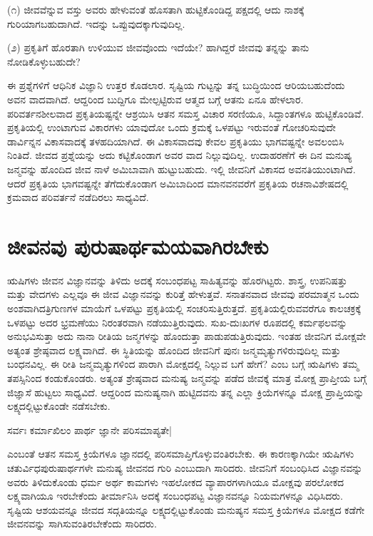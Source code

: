 (೧) ಜೀವವೆನ್ನುವ ವಸ್ತು ಅವರು ಹೇಳುವಂತೆ ಹೊಸತಾಗಿ ಹುಟ್ಟಿಕೊಂಡಿದ್ದ ಪಕ್ಷದಲ್ಲಿ ಆದು ನಾಶಕ್ಕೆ ಗುರಿಯಾಗಬಹುದಾಗಿದೆ. ಇದನ್ನು ಒಪ್ಪುವುದಕ್ಕಾಗುವುದಿಲ್ಲ. 

(೨) ಪ್ರಕೃತಿಗೆ ಹೊರತಾಗಿ ಉಳಿಯುವ ಜೀವವೊಂದು ಇದೆಯೇ? ಹಾಗಿದ್ದರೆ ಜೀವವು ತನ್ನನ್ನು ತಾನು ನೋಡಿಕೊಳ್ಳುಬಹುದೇ? 

ಈ ಪ್ರಶ್ನೆಗಳಿಗೆ ಆಧಿನಿಕ ವಿಜ್ಞಾನಿ ಉತ್ತರ ಕೊಡಲಾರ. ಸೃಷ್ಟಿಯ ಗುಟ್ಟನ್ನು ತನ್ನ ಬುದ್ಧಿಯಿಂದ ಆರಿಯಬಹುದೆಂದು ಅವನ ವಾದವಾಗಿದೆ. ಆದ್ದರಿಂದ ಬುದ್ದಿಗೂ ಮೇಲ್ಪಟ್ಟಿರುವ ಆತ್ಮದ ಬಗ್ಗೆ ಆತನು ಏನೂ ಹೇಳಲಾರ. ಪರಿವರ್ತನಶೀಲವಾದ ಪ್ರಕೃತಿಯಷ್ಟನ್ನೇ ಆಶ್ರಯಿಸಿ ಆತನ ಸಮಸ್ತ ವಿಚಾರ ಸರಣಿಯೂ, ಸಿದ್ದಾಂತಗಳೂ ಹುಟ್ಟಿಕೊಂಡಿವೆ. ಪ್ರಕೃತಿಯಲ್ಲಿ ಉಂಟಾಗುವ ವಿಕಾರಗಳು ಯಾವುದೋ ಒಂದು ಕ್ರಮಕ್ಕೆ ಒಳಪಟ್ಟು ಇರುವಂತೆ ಗೋಚರಿಸುವುದೇ ಡಾರ್ವಿನ್ನನ ವಿಕಾಸವಾದಕ್ಕೆ ತಳಹದಿಯಾಗಿದೆ. ಈ ವಿಕಾಸವಾದವು ಕೇವಲ ಪ್ರಕೃತಿಯು ಭಾಗವಷ್ಟನ್ನೇ ಅವಲಂಬಿಸಿ ನಿಂತಿದೆ. ಜೀವದ ಪ್ರಶ್ನೆಯನ್ನು ಅದು ಕಟ್ಟಿಕೊಂಡಾಗ ಅವರ ವಾದ ನಿಲ್ಲುವುದಿಲ್ಲ. ಉದಾಹರಣೆಗೆ ಈ ದಿನ ಮನುಷ್ಯ ಜನ್ಮವನ್ನು ಹೊಂದಿದ ಜೀವ ನಾಳೆ ಅಮಿಬಾವಾಗಿ ಹುಟ್ಟುಬಹುದು. ಇಲ್ಲಿ ಜೀವನಿಗೆ ವಿಕಾಸದ ಅವನತಿಯುಂಟಾಗಿದೆ. ಆದರೆ ಪ್ರಕೃತಿಯ ಭಾಗವಷ್ಟನ್ನೇ ತೆಗೆದುಕೊಂಡಾಗ ಅಮಿಬಾದಿಂದ ಮಾನವನವರೆಗೆ ಪ್ರಕೃತಿಯ ರಚನಾವಿಶೇಷದಲ್ಲಿ ಕ್ರಮವಾದ ಪರಿವರ್ತನೆ ನಡೆದಿರಲು ಸಾಧ್ಯವಿದೆ.

\section*{ಜೀವನವು ಪುರುಷಾರ್ಥಮಯವಾಗಿರಬೇಕು}

ಋಷಿಗಳು ಜೀವನ ವಿಜ್ಞಾನವನ್ನು ತಿಳಿದು ಅದಕ್ಕೆ ಸಂಬಂಧಪಟ್ಟ ಸಾಹಿತ್ಯವನ್ನು ಹೊರಗಿಟ್ಟರು. ಶಾಸ್ತ್ರ, ಉಪನಿಷತ್ತು ಮತ್ತು ವೇದಗಳು ಎಲ್ಲವೂ ಈ ಜೀವ ವಿಜ್ಞಾನವನ್ನು ಕುರಿತ್ತೆ ಹೇಳುತ್ತವೆ. ಸನಾತನವಾದ ಜೀವವು ಪರಮಾತ್ಮನ ಒಂದು ಅಂಶವಾಗಿದತ್ರಿಗುಣಗಳ ಮಾಯೆಗೆ ಒಳಪಟ್ಟು ಪ್ರಕೃತಿಯಲ್ಲಿ ಸಂಚರಿಸುತ್ತಿರುತ್ತದೆ. ಪ್ರಕೃತಿಯಲ್ಲಿರುವವರೆಗೂ ಕಾಲಚಕ್ರಕ್ಕೆ ಒಳಪಟ್ಟು ಅದರ ಭ್ರಮಣೆಯು ನಿರಂತರವಾಗಿ ನಡೆಯುತ್ತಿರುವುದು. ಸುಖ-ದುಃಖಗಳ ರೂಪದಲ್ಲಿ ಕರ್ಮಫಲವನ್ನು ಅನುಭವಿಸುತ್ತಾ ಅದು ನಾನಾ ರೀತಿಯ ಜನ್ಮಗಳನ್ನು ಹೊಂದುತ್ತಾ ಪಾಡುಪಡುತ್ತಿರುವುದು. ಇಂತಹ ಜೀವನಿಗ ಮೋಕ್ಷವೇ ಅತ್ಯಂತ ಶ್ರೇಷ್ಠವಾದ ಲಕ್ಷ್ಯವಾಗಿದೆ. ಈ ಸ್ಥಿತಿಯನ್ನು ಹೊಂದಿದ ಜೀವನಿಗೆ ಪುನಃ ಜನ್ಮಮೃತ್ಯುಗಳಿರುವುದಿಲ್ಲ ಮತ್ತು ಬಂಧನವಿಲ್ಲ. ಈ ರೀತಿ ಜನ್ಮಮೃತ್ಯುಗಳಿಂದ ಪಾರಾಗಿ ಮೋಕ್ಷದಲ್ಲಿ ನಿಲ್ಲುವ ಬಗೆ ಹೇಗೆ? ಎಂಬ ಬಗ್ಗೆ ಋಷಿಗಳು ತಮ್ಮ ತಪಸ್ಸಿನಿಂದ ಕಂಡುಕೊಂಡರು. ಅತ್ಯಂತ ಶ್ರೇಷ್ಠವಾದ ಮನುಷ್ಯ ಜನ್ಮವನ್ನು ಪಡೆದ ಜೀವಕ್ಕೆ ಮಾತ್ರ ಮೋಕ್ಷ ಪ್ರಾಪ್ತೀಯ ಬಗ್ಗೆ ಜಿಜ್ಞಾಸೆ ಹುಟ್ಟಲು ಸಾಧ್ಯವಿದೆ. ಆದ್ದರಿಂದ ಮನುಷ್ಯನಾಗಿ ಹುಟ್ಟಿದವನು ತನ್ನ ಎಲ್ಲಾ‌ ಕ್ರಿಯೆಗಳನ್ನೂ ಮೋಕ್ಷ ಪ್ರಾಪ್ತಿಯನ್ನು ಲಕ್ಷ್ಯದಲ್ಲಿಟ್ಟುಕೊಂಡೇ ನಡೆಸಬೇಕು.

\begin{shloka}
ಸರ್ವಃ ಕರ್ಮಾಖಿಲಂ ಪಾರ್ಥ ಜ್ಞಾನೇ ಪರಿಸಮಾಪ್ಯತೇ|
\end{shloka}

ಎಂಬಂತೆ ಆತನ ಸಮಸ್ತ ಕ್ರಿಯೆಗಳೂ ಜ್ಞಾನದಲ್ಲಿ ಪರಿಸಮಾಪ್ತಿಗೊಳ್ಳುವಂತಿರಬೇಕು. ಈ ಕಾರಣಕ್ಕಾಗಿಯೇ ಋಷಿಗಳು ಚತುರ್ವಿಧಪುರುಷಾರ್ಥಗಳೇ ಮನುಷ್ಯ ಜೀವನದ ಗುರಿ ಎಂಬುದಾಗಿ ಸಾರಿದರು. ಜೀವನಿಗೆ ಸಂಬಂಧಿಸಿದ ವಿಜ್ಞಾನವನ್ನು ಅವರು ತಿಳಿದುಕೊಂಡು ಧರ್ಮ ಅರ್ಥ ಕಾಮಗಳು ಇಹಲೋಕದ ವ್ಯಾಪಾರಗಳಾಗಿಯೂ ಮೋಕ್ಷವು ಪರಲೋಕದ ಲಕ್ಷ್ಯವಾಗಿಯೂ ಇರಬೇಕೆಂದು ತೀರ್ಮಾನಿಸಿ ಅದಕ್ಕೆ ಸಂಬಂಧಪಟ್ಟ ವಿಜ್ಞಾನವನ್ನೂ ನಿಯಮಗಳನ್ನೂ ವಿಧಿಸಿದರು. ಸೃಷ್ಟಿಯ ಆಶಯವನ್ನೂ ಜೀವದ ಸದ್ಗತಿಯನ್ನೂ ಲಕ್ಷ್ಯದಲ್ಲಿಟ್ಟುಕೊಂಡು ಮನುಷ್ಯನ ಸಮಸ್ತ ಕ್ರಿಯೆಗಳೂ ಮೋಕ್ಷದ ಕಡೆಗೇ ಜೀವನವನ್ನು ಸಾಗಿಸುವಂತಿರಬೇಕೆಂದು ಸಾರಿದರು.

